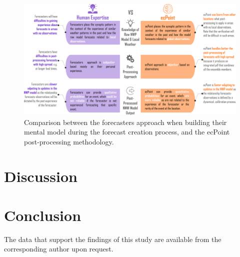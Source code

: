 \documentclass[twocol]{ametsocV5} %
\begin{document}
\begin{figure}
\centerline{\includegraphics[width=39pc]{manuscript/Figures/Results_Correlation_Forecasters_ecPoint.png}}
\caption{Comparison between the forecasters approach when building their mental model during the forecast creation process, and the ecPoint post-processing methodology.}
\label{Results_Correlation_Forecasters_ecPoint}
\end{figure}



\section{Discussion}


\section{Conclusion}


\acknowledgments


\datastatement
The data that support the findings of this study are available from the corresponding author upon request.




\end{document}
